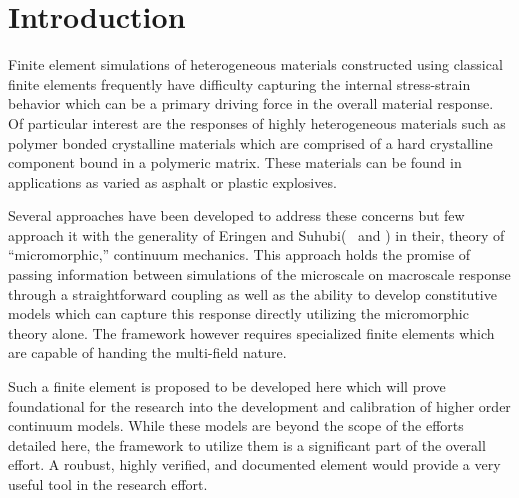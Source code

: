\section{Introduction}

Finite element simulations of heterogeneous materials constructed using classical finite elements frequently have difficulty capturing the internal stress-strain behavior which can be a primary driving force in the overall material response. Of particular interest are the responses of highly heterogeneous materials such as polymer bonded crystalline materials which are comprised of a hard crystalline component bound in a polymeric matrix. These materials can be found in applications as varied as asphalt or plastic explosives.

Several approaches have been developed to address these concerns but few approach it with the generality of Eringen and Suhubi(~\cite{bib:eringen64} and \cite{bib:eringen64_2}) in their, theory of ``micromorphic,'' continuum mechanics. This approach holds the promise of passing information between simulations of the microscale on macroscale response through a straightforward coupling as well as the ability to develop constitutive models which can capture this response directly utilizing the micromorphic theory alone. The framework however requires specialized finite elements which are capable of handing the multi-field nature.

Such a finite element is proposed to be developed here which will prove foundational for the research into the development and calibration of higher order continuum models. While these models are beyond the scope of the efforts detailed here, the framework to utilize them is a significant part of the overall effort. A roubust, highly verified, and documented element would provide a very useful tool in the research effort.